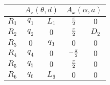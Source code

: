\begin{tabular}{c|c|c|c|c|}
            \cline{2-5} &
            \multicolumn{2}{|c|}{$A_z(\theta,d)$} &
            \multicolumn{2}{|c|}{$A_x(\alpha,a)$} \\
            \hline
        \multicolumn{1}{|c|}{$R_1$} & $q_{1}$ & $L_{1}$ & ${{\pi}\over{2}}$ & $0$ \\
            \hline
        \multicolumn{1}{|c|}{$R_2$} & $q_{2}$ & $0$ & ${{\pi}\over{2}}$ & $D_{2}$ \\
            \hline
        \multicolumn{1}{|c|}{$R_3$} & $0$ & $q_{3}$ & $0$ & $0$ \\
            \hline
        \multicolumn{1}{|c|}{$R_4$} & $q_{4}$ & $0$ & $-{{\pi}\over{2}}$ & $0$ \\
            \hline
        \multicolumn{1}{|c|}{$R_5$} & $q_{5}$ & $0$ & ${{\pi}\over{2}}$ & $0$ \\
            \hline
        \multicolumn{1}{|c|}{$R_6$} & $q_{6}$ & $L_{6}$ & $0$ & $0$ \\
            \hline
\end{tabular}
